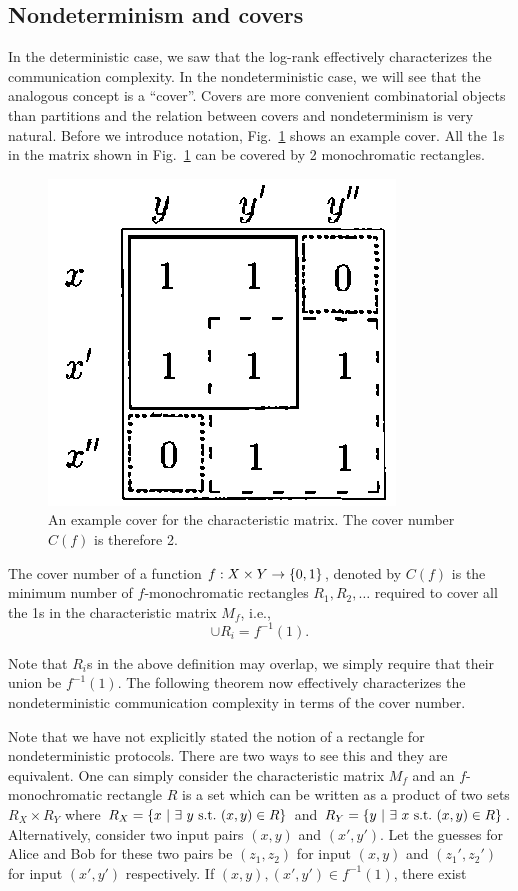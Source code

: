 \documentclass[letterpaper]{article}
\providecommand\cbrac[1]{\ensuremath \left\{#1\right\}}
\newcommand{\X}{X}
\newcommand{\Y}{Y}
\newcommand{\mf}{M_f}
\newcommand{\cf}{C(f)}
\newcommand{\pc}[2]{{\color{brown} #1}\marginpar{\tiny\noindent{\raggedright{\color{ForestGreen}[PC]}\color{brown}{ #2} \par}}}
\begin{document}
\subsection{Nondeterminism and covers}

In the deterministic case, we saw that the log-rank effectively characterizes the communication complexity. In the nondeterministic case, we will see that the analogous concept is a ``cover''. Covers are more convenient combinatorial objects than partitions and the relation between covers and nondeterminism is very natural. Before we introduce notation, Fig.~\ref{fig:cover_example} shows an example cover. All the 1s in the matrix shown in Fig.~\ref{fig:cover_example} can be covered by 2 monochromatic rectangles.
\begin{figure}
\centering
\includegraphics[width=0.3 \textwidth]{cover_example}
\caption{An example cover for the characteristic matrix. The cover number $\cf$ is therefore 2.}
\label{fig:cover_example}
\end{figure}

\begin{definition}
The cover number of a function $f : \X \times \Y \to \cbrac{0,1}$, denoted by $\cf$ is the minimum number of $f$-monochromatic rectangles $R_1, R_2, \ldots$ required to cover all the 1s in the characteristic matrix $\mf$, i.e.,
$$
\cup R_i = f^{-1}(1).
$$
\end{definition}
Note that $R_i$s in the above definition may overlap, we simply require that their union be $f^{-1}(1)$. The following theorem now effectively characterizes the nondeterministic communication complexity in terms of the cover number.

Note that we have not explicitly stated the notion of a rectangle for nondeterministic protocols. There are two ways to see this and they are equivalent. One can simply consider the characteristic matrix $\mf$ and an $f$-monochromatic rectangle $R$ is a set which can be written as a product of two sets $R_X \times R_Y$ where $R_X = \cbrac{ x\ |\ \exists\ y\ \mathrm{s.t.}\ (x,y) \in R}$ and $R_Y = \cbrac{ y\ |\ \exists\ x\ \mathrm{s.t.}\ (x,y) \in R}$. Alternatively, consider two input pairs $(x,y)$ and $(x', y')$. Let the guesses for Alice and Bob for these two pairs be $(z_1, z_2)$ for input $(x,y)$ and $(z_1', z_2')$ for input $(x',y')$ respectively. \pc{If $(x,y), (x',y') \in f^{-1}(1)$, there exist}{}
\end{document}

